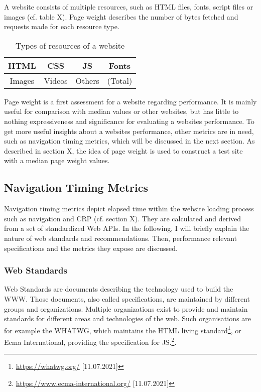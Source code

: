 A website consists of multiple resources, such as HTML files, fonts, script files or images (cf. table X).
Page weight describes the number of bytes fetched and requests made for each resource type. %

\begin{table}[h]
	\small
	\centering
	\begin{tabular}{| c | c | c | c | }
	\hline
	HTML & CSS  & JS & Fonts \\
	\hline
	Images & Videos & Others & (Total) \\
	\hline
	\end{tabular}
	\medskip
	\caption{Types of resources of a website}
	\label{table:website_resources} %
\end{table}

Page weight is a first assessment for a website regarding performance.
It is mainly useful for comparison with median values or other websites, but has little to nothing expressiveness and significance for evaluating a websites performance.
To get more useful insights about a websites performance, other metrics are in need, such as navigation timing metrics, which will be discussed in the next section.
As described in section X,  the idea of page weight is used to construct a test site with a median page weight values.




\subsection{Navigation Timing Metrics}

Navigation timing metrics depict elapsed time within the website loading process such as navigation and CRP (cf.  section X).
They are calculated and derived from a set of standardized Web APIs.
In the following, I will briefly explain the nature of web standards and recommendations.
Then, performance relevant specifications and the metrics they expose are discussed.


\subsubsection{Web Standards}

Web Standards are documents describing the technology used to build the WWW. %
Those documents, also called specifications, are maintained by different groups and organizations.
Multiple organizations exist to provide and maintain standards for different areas and technologies of the web.
Such organisations are for example the WHATWG, which maintains the HTML living standard\footnote{\url{https://whatwg.org/} [11.07.2021]}, or Ecma International, providing the specification for JS.\footnote{\url{https://www.ecma-international.org/} [11.07.2021]}.

